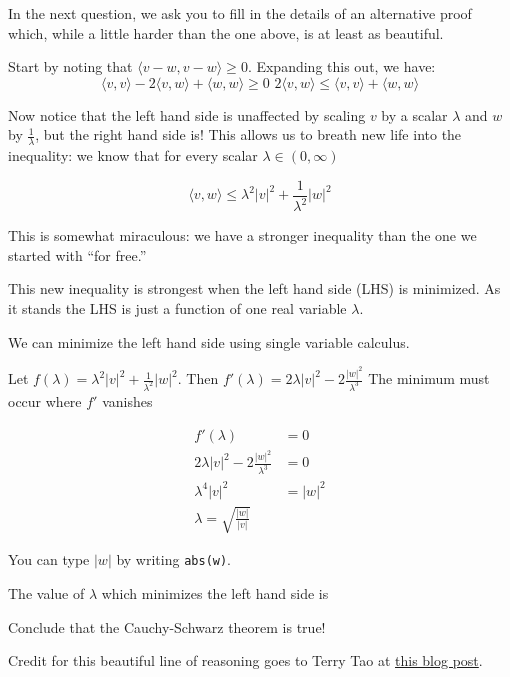 \documentclass{ximera}
\begin{document}
In the next question, we ask you to fill in the details of an alternative proof which, while a little harder than the one above, is at least as beautiful.

\begin{question}
  Start by noting that $\langle v-w,v-w\rangle \geq 0 $.  Expanding this out, we have:
  \[
  \langle v,v \rangle - 2 \langle v,w \rangle +\langle  w,w\rangle \geq 0 \,\,
  2\langle v,w \rangle \leq \langle v,v \rangle  + \langle w,w\rangle
  \]
  
  Now notice that the left hand side is unaffected by scaling $v$ by a scalar $\lambda$ and $w$ by $\frac{1}{\lambda}$, but the right hand side is!
  This allows us to breath new life into the inequality:  we know that for every scalar $\lambda \in (0,\infty)$ 
  
  \[
  \langle  v,w \rangle \leq \lambda^2 |v|^2 + \frac{1}{\lambda^2} |w|^2
  \] 
  
  This is somewhat miraculous:  we have a stronger inequality than the one we started with ``for free.''
  
  This new inequality is strongest when the left hand side (LHS) is minimized.  As it stands the LHS is just a function of one real variable $\lambda$.
  
  \begin{solution}
    \begin{hint}
      We can minimize the left hand side using single variable calculus.
    \end{hint}
    \begin{hint}
      Let $f(\lambda) = \lambda^2 |v|^2 + \frac{1}{\lambda^2} |w|^2$.
      Then $f'(\lambda) = 2\lambda |v|^2 -2\frac{|w|^2}{\lambda^3}$
      The minimum must occur where $f'$ vanishes
    \end{hint}
    \begin{hint}
      \begin{align*}
        f'(\lambda) &= 0\\
        2\lambda |v|^2 -2\frac{|w|^2}{\lambda^3} &= 0\\
        \lambda^4 |v|^2 &=|w|^2\\
        \lambda = \sqrt{\frac{|w|}{|v|}}
      \end{align*}
    \end{hint}
    \begin{hint}
      You can type $|w|$ by writing \verb|abs(w)|.
    \end{hint}
    The value of $\lambda$ which minimizes the left hand side is 	
  \end{solution}
  
  Conclude that the Cauchy-Schwarz theorem is true!
  
  Credit for this beautiful line of reasoning goes to Terry Tao at 
  \href{https://terrytao.wordpress.com/2007/09/05/amplification-arbitrage-and-the-tensor-power-trick/}{this blog post}.
  
\end{question}
\end{document}
